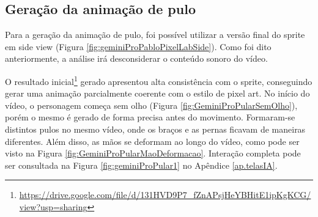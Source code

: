 \FloatBarrier
\subsection{Geração da animação de pulo}
\label{s.gemini.animacaoPular}

Para a geração da animação de pulo, foi possível utilizar a versão final do sprite em side view (Figura \ref{fig:geminiProPabloPixelLabSide}). Como foi dito anteriormente, a análise irá desconsiderar o conteúdo sonoro do vídeo.

O resultado inicial\footnote{\url{https://drive.google.com/file/d/131HVD9P7_fZnAPsjHeYBHitE1ipKgKCG/view?usp=sharing}} gerado apresentou alta consistência com o sprite, conseguindo gerar uma animação parcialmente coerente com o estilo de pixel art. No início do vídeo, o personagem começa sem olho (Figura \ref{fig:GeminiProPularSemOlho}), porém o mesmo é gerado de forma precisa antes do movimento. Formaram-se distintos pulos no mesmo vídeo, onde os braços e as pernas ficavam de maneiras diferentes. Além disso, as mãos se deformam ao longo do vídeo, como pode ser visto na Figura \ref{fig:GeminiProPularMaoDeformacao}. Interação completa pode ser consultada na Figura
\ref{fig:geminiProPular1} no Apêndice \ref{ap.telasIA}.

